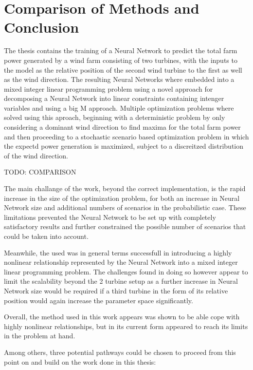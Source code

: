 
\chapter{Comparison of Methods and Conclusion}\label{chapter:conclusion}

The thesis contains the training of a Neural Network to predict the total farm power generated by a wind farm consisting of two turbines, with the inputs to the model as the relative position of the second wind turbine to the first as well as the wind direction. The resulting Neural Networks where embedded into a mixed integer linear programming problem using a novel approach for decomposing a Neural Network into linear constraints containing intenger variables and using a big M approach. Multiple optimization problems where solved using this aproach, beginning with a deterministic problem by only considering a dominant wind direction to find maxima for the total farm power and then proceeding to a stochastic scenario based optimization problem in which the expectd power generation is maximized, subject to a discreitzed distribution of the wind direction. 

TODO: COMPARISON

The main challange of the work, beyond the correct implementation, is the rapid increase in the size of the optimization problem, for both an increase in Neural Network size and additional numbers of scenarios in the probabilistic case. These limitations prevented the Neural Network to be set up with completely satisfactory results and further constrained the possible number of scenarios that could be taken into account. 

Meanwhile, the used was in general terms successfull in introducing a highly nonlinear relationship represented by the Neural Network into a mixed integer linear programming problem. The challenges found in doing so however appear to limit the scalability beyond the 2 turbine setup as a further increase in Neural Network size would be required if a third turbine in the form of its relative position would again increase the parameter space significantly. 

Overall, the method used in this work appears was shown to be able cope with highly nonlinear relationships, but in its current form appeared to reach its limits in the problem at hand. 

Among others, three potential pathways could be chosen to proceed from this point on and build on the work done in this thesis: 

